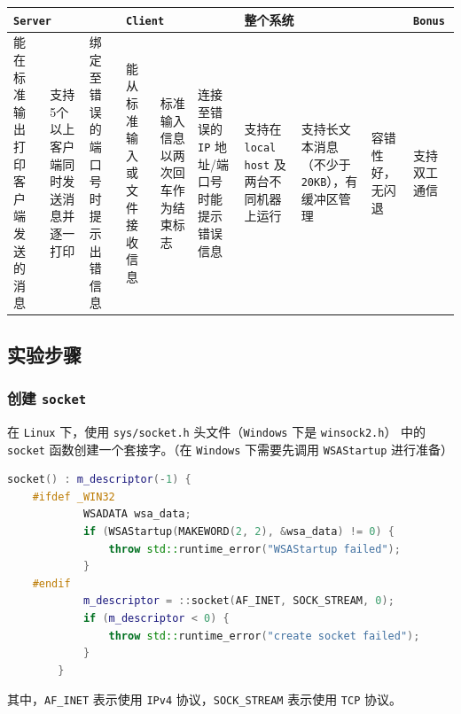 \documentclass{article}
\begin{document}
\begin{table}[H]
    \centering
    \begin{tabularx}{0.95\textwidth}{|X|X|X|X|X|X|X|X|X|X|}
        \hline
        \multicolumn{3}{|X|}{\texttt{Server}} & \multicolumn{3}{|X|}{\texttt{Client}}   & \multicolumn{3}{|X|}{整个系统}   & \texttt{Bonus}                                                                                                                                                                                                                                                    \\
        \hline
        能在标准输出打印客户端发送的消息      & 支持5个以上客户端同时发送消息并逐一打印 & 绑定至错误的端口号时提示出错信息 & 能从标准输入或文件接收信息 & 标准输入信息以两次回车作为结束标志 & 连接至错误的 \texttt{IP} 地址/端口号时能提示错误信息 & 支持在 \texttt{local host} 及两台不同机器上运行 & 支持长文本消息（不少于 \texttt{20KB}），有缓冲区管理 & 容错性好，无闪退 & 支持双工通信 \\
        \hline
    \end{tabularx}
\end{table}

\subsection{实验步骤}

\subsubsection{创建 \texttt{socket}}

在 \texttt{Linux} 下，使用 \texttt{sys/socket.h} 头文件（\texttt{Windows} 下是 \texttt{winsock2.h}） 中的 \texttt{socket} 函数创建一个套接字。（在 \texttt{Windows} 下需要先调用 \texttt{WSAStartup} 进行准备）

\begin{lstlisting}[language=C++, title=创建套接字]
        socket() : m_descriptor(-1) {
    #ifdef _WIN32
            WSADATA wsa_data;
            if (WSAStartup(MAKEWORD(2, 2), &wsa_data) != 0) {
                throw std::runtime_error("WSAStartup failed");
            }
    #endif
            m_descriptor = ::socket(AF_INET, SOCK_STREAM, 0);
            if (m_descriptor < 0) {
                throw std::runtime_error("create socket failed");
            }
        } 
\end{lstlisting}

其中，\texttt{AF\_INET} 表示使用 \texttt{IPv4} 协议，\texttt{SOCK\_STREAM} 表示使用 \texttt{TCP} 协议。
\end{document}
